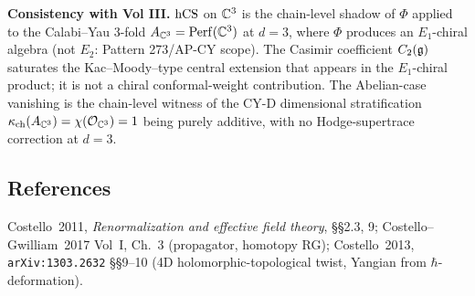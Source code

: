 \textbf{Consistency with Vol III.} $\mathrm{hCS}$ on $\mathbb{C}^3$ is the
chain-level shadow of $\Phi$ applied to the Calabi--Yau 3-fold
$A_{\mathbb{C}^3} = \mathrm{Perf}(\mathbb{C}^3)$ at $d=3$, where $\Phi$ produces an
$E_1$-chiral algebra (not $E_2$: Pattern 273/AP-CY scope). The Casimir
coefficient $C_2(\mathfrak{g})$ saturates the Kac--Moody--type central extension
that appears in the $E_1$-chiral product; it is not a chiral
conformal-weight contribution. The Abelian-case vanishing is the
chain-level witness of the CY-D dimensional stratification
$\kappa_{\mathrm{ch}}(A_{\mathbb{C}^3}) = \chi(\mathcal{O}_{\mathbb{C}^3}) = 1$ being purely additive, with no
Hodge-supertrace correction at $d=3$.

\subsection{References}
Costello~2011, \emph{Renormalization and effective field theory},
\S\S2.3, 9; Costello--Gwilliam~2017 Vol~I, Ch.~3 (propagator,
homotopy RG); Costello~2013, \texttt{arXiv:1303.2632} \S\S9--10
(4D holomorphic-topological twist, Yangian from $\hbar$-deformation).
